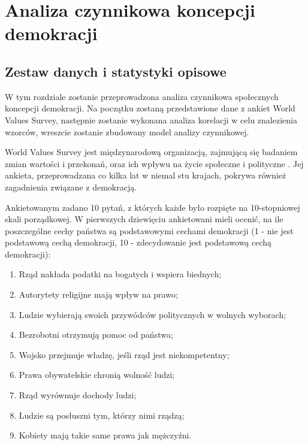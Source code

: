 \documentclass[12pt]{article}
\providecommand{\tightlist}{%
  \setlength{\itemsep}{0pt}\setlength{\parskip}{0pt}}
\begin{document}
\newpage

\hypertarget{analiza-czynnikowa-koncepcji-demokracji}{%
\section{Analiza czynnikowa koncepcji demokracji}\label{analiza-czynnikowa-koncepcji-demokracji}}

\hypertarget{zestaw-danych-i-statystyki-opisowe}{%
\subsection{Zestaw danych i statystyki opisowe}\label{zestaw-danych-i-statystyki-opisowe}}

W tym rozdziale zostanie przeprowadzona analiza czynnikowa społecznych koncepcji demokracji. Na początku zostaną przedstawione dane z ankiet World Values Survey, następnie zostanie wykonana analiza korelacji w celu znalezienia wzorców, wreszcie zostanie zbudowany model analizy czynnikowej.

World Values Survey jest międzynarodową organizacją, zajmującą się badaniem zmian wartości i przekonań, oraz ich wpływu na życie społeczne i polityczne \citep{WVSData}. Jej ankieta, przeprowadzana co kilka lat w niemal stu krajach, pokrywa również zagadnienia związane z demokracją.

Ankietowanym zadano 10 pytań, z których każde było rozpięte na 10-stopniowej skali porządkowej. W pierwszych dziewięciu ankietowani mieli ocenić, na ile poszczególne cechy państwa są podstawowymi cechami demokracji (1 - nie jest podstawową cechą demokracji, 10 - zdecydowanie jest podstawową cechą demokracji):

\begin{enumerate}
\def\labelenumi{\arabic{enumi}.}
\tightlist
\item
  Rząd nakłada podatki na bogatych i wspiera biednych;
\item
  Autorytety religijne mają wpływ na prawo;
\item
  Ludzie wybierają swoich przywódców politycznych w wolnych wyborach;
\item
  Bezrobotni otrzymują pomoc od państwa;
\item
  Wojsko przejmuje władzę, jeśli rząd jest niekompetentny;
\item
  Prawa obywatelskie chronią wolność ludzi;
\item
  Rząd wyrównuje dochody ludzi;
\item
  Ludzie są posłuszni tym, którzy nimi rządzą;
\item
  Kobiety mają takie same prawa jak mężczyźni.
\end{enumerate}
\end{document}
